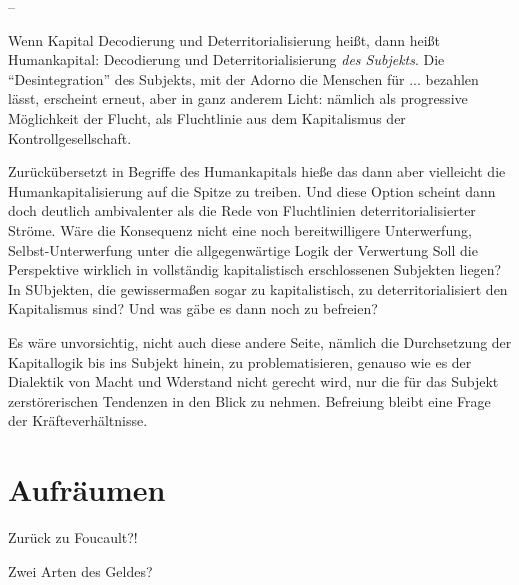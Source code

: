 \documentclass[12pt,
               DIV13,
               paper=a4,
               twoside=false,
               onehalfspacing,
               bibliography=totoc,
               toc=graduated,
               draft,
               ]{scrartcl}
\newcommand{\worries}[1]{\ifdraft{\textcolor{blue}{\texttt{(#1)}}}{}}
\begin{document}
--

Wenn Kapital Decodierung und Deterritorialisierung heißt, dann heißt
Humankapital: Decodierung und Deterritorialisierung \emph{des
Subjekts}. Die "`Desintegration"' des Subjekts, mit der Adorno die
Menschen für ... bezahlen lässt, erscheint erneut, aber in ganz
anderem Licht: nämlich als progressive Möglichkeit der Flucht, als
Fluchtlinie aus dem Kapitalismus der Kontrollgesellschaft.

Zurückübersetzt in Begriffe des Humankapitals hieße das dann aber
vielleicht die Humankapitalisierung auf die Spitze zu treiben. Und
diese Option scheint dann doch deutlich ambivalenter als die Rede von
Fluchtlinien deterritorialisierter Ströme. Wäre die Konsequenz nicht
eine noch bereitwilligere Unterwerfung, Selbst-Unterwerfung unter die
allgegenwärtige Logik der Verwertung Soll die Perspektive wirklich in
vollständig kapitalistisch erschlossenen Subjekten liegen? In
SUbjekten, die gewissermaßen sogar zu kapitalistisch, zu
deterritorialisiert den Kapitalismus sind? Und was gäbe es dann noch
zu befreien? \worries{"`vorsubjektive Einheiten"'}

Es wäre unvorsichtig, nicht auch diese andere Seite, nämlich die
Durchsetzung der Kapitallogik bis ins Subjekt hinein, zu
problematisieren, genauso wie es der Dialektik von Macht und Wderstand
nicht gerecht wird, nur die für das Subjekt zerstörerischen Tendenzen
in den Blick zu nehmen. Befreiung bleibt eine Frage der
Kräfteverhältnisse.


\section{Aufräumen}

Zurück zu Foucault?!

Zwei Arten des Geldes?


\newpage
\printshorthands
\printbibliography
\end{document}
